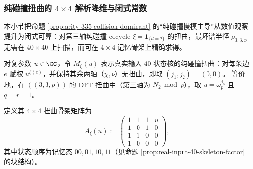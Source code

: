 \subsubsection{纯碰撞扭曲的 \texorpdfstring{$4\times 4$}{4x4} 解析降维与闭式常数}\label{subsec:arity-335-collision-4x4}
本小节把命题 \ref{prop:arity-335-collision-dominant} 的“纯碰撞慢模主导”从数值观察提升为闭式可算：对第三轴纯碰撞 cocycle
\(
\xi=\mathbf{1}_{\{d=2\}}
\)
的扭曲，最坏谱半径 \(\rho_{3,3,p}\) 无需在 \(40\times 40\) 上扫描，而可在 \(4\times 4\) 记忆骨架上精确求得。

\begin{definition}[纯碰撞扭曲矩阵与扭曲骨架]\label{def:arity-collision-twist-skeleton}
对复参数 \(u\in\CC\)，令 \(M_\xi(u)\) 表示真实输入 \(40\) 状态核的纯碰撞扭曲：对每条边 \(e\) 赋权 \(u^{\xi(e)}\)，并保持其余两轴（\(\chi,\nu\)）无扭曲，即取 \((j_1,j_2)=(0,0)\)。
等价地，在 \(((3,3,p))\) 的 DFT 扭曲中（第三轴为 \(N_2\bmod p\)），取 \(u=\omega_p^{j_3}\) 且 \(q=r=1\)。

定义其 \(4\times 4\) 扭曲骨架矩阵为
$$
A_\xi(u):=
\begin{pmatrix}
1&1&1&u\\
1&0&1&0\\
1&1&0&0\\
1&0&0&0
\end{pmatrix},
$$
其中状态顺序为记忆态 \(00,01,10,11\)（见命题 \ref{prop:real-input-40-skeleton-factor} 的块结构）。
\end{definition}


